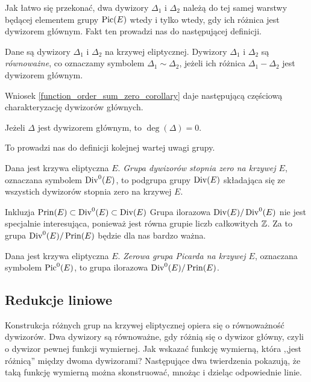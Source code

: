 \noindent
Jak łatwo się przekonać,
dwa dywizory $\Delta_1$ i $\Delta_2$ należą do tej samej warstwy
będącej elementem grupy $\operatorname{Pic}(E)$
wtedy i tylko wtedy, gdy ich różnica jest dywizorem głównym.
Fakt ten prowadzi nas do następującej definicji.

\begin{definition}
Dane są dywizory $\Delta_1$ i $\Delta_2$ na krzywej eliptycznej.
Dywizory $\Delta_1$ i $\Delta_2$ są \emph{równoważne},
co oznaczamy symbolem $\Delta_1 \sim \Delta_2$,
jeżeli ich różnica $\Delta_1 - \Delta_2$ jest dywizorem głównym.
\end{definition}

\noindent
Wniosek \ref{function_order_sum_zero_corollary}
daje następującą częściową charakteryzację dywizorów głównych.

\begin{fact}\label{prin_divi_zero_deg_fact}
Jeżeli $\Delta$ jest dywizorem głównym,
to $\deg(\Delta) = 0$.
\end{fact}

\noindent
To prowadzi nas do definicji kolejnej wartej uwagi grupy.

\begin{definition}
Dana jest krzywa eliptyczna $E$.
\emph{Grupa dywizorów stopnia zero na krzywej $E$},
oznaczana symbolem $\operatorname{Div}^0(E)$,
to podgrupa grupy $\operatorname{Div}(E)$
składająca się ze wszystich dywizorów stopnia zero na krzywej $E$.
\end{definition}

\noindent
Inkluzja $\operatorname{Prin}(E) \subset \operatorname{Div}^0(E) \subset \operatorname{Div}(E)$
Grupa ilorazowa $\operatorname{Div}(E) / \operatorname{Div}^0(E)$
nie jest specjalnie interesująca,
ponieważ jest równa grupie liczb całkowitych $\mathbb{Z}$.
Za to grupa $\operatorname{Div}^0(E) / \operatorname{Prin}(E)$
będzie dla nas bardzo ważna.

\begin{definition}
Dana jest krzywa eliptyczna $E$.
\emph{Zerowa grupa Picarda na krzywej $E$},
oznaczana symbolem $\operatorname{Pic}^0(E)$,
to grupa ilorazowa $\operatorname{Div}^0(E) / \operatorname{Prin}(E)$.
\end{definition}

\subsection*{Redukcje liniowe}

\noindent
Konstrukcja różnych grup na krzywej eliptycznej opiera się
o równoważność dywizorów. Dwa dywizory są równoważne,
gdy różnią się o dywizor główny, czyli o dywizor pewnej funkcji wymiernej.
Jak wskazać funkcję wymierną, która ,,jest różnicą'' między dwoma dywizorami?
Następujące dwa twierdzenia pokazują, że taką funkcję wymierną
można skonstruować, mnożąc i dzieląc odpowiednie linie.

